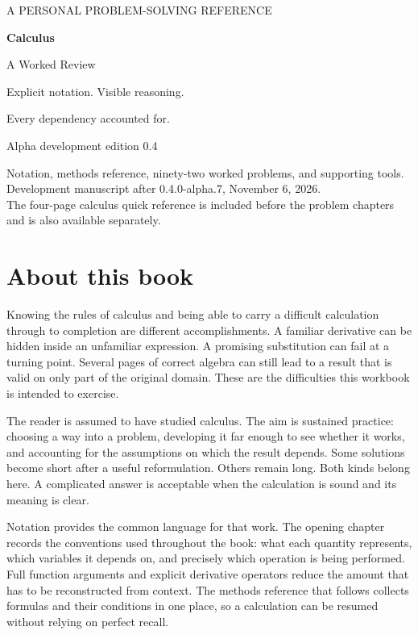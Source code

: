 \documentclass[11pt,oneside,openany]{book}
\begin{document}
\frontmatter
\begin{titlepage}
\color{Ink}
\vspace*{0.7in}
{\sffamily\large A PERSONAL PROBLEM-SOLVING REFERENCE\par}
\vspace{0.5in}
{\sffamily\bfseries\fontsize{40}{46}\selectfont Calculus\par}
\vspace{0.15in}
{\sffamily\LARGE A Worked Review\par}
\vspace{0.45in}
{\Large Explicit notation. Visible reasoning.\par}
{\Large Every dependency accounted for.\par}
\vfill
{\sffamily\large Alpha development edition 0.4\par}
\medskip
Notation, methods reference, ninety-two worked problems, and supporting tools.\\
Development manuscript after 0.4.0-alpha.7, November 6, 2026.\\
The four-page calculus quick reference is included before the problem chapters
and is also available separately.
\end{titlepage}
\chapter*{About this book}

Knowing the rules of calculus and being able to carry a difficult calculation
through to completion are different accomplishments. A familiar derivative can
be hidden inside an unfamiliar expression. A promising substitution can fail at
a turning point. Several pages of correct algebra can still lead to a result
that is valid on only part of the original domain. These are the difficulties
this workbook is intended to exercise.

The reader is assumed to have studied calculus. The aim is sustained practice:
choosing a way into a problem, developing it far enough to see whether it works,
and accounting for the assumptions on which the result depends. Some solutions
become short after a useful reformulation. Others remain long. Both kinds belong
here. A complicated answer is acceptable when the calculation is sound and its
meaning is clear.

Notation provides the common language for that work. The opening chapter records
the conventions used throughout the book: what each quantity represents, which
variables it depends on, and precisely which operation is being performed. Full
function arguments and explicit derivative operators reduce the amount that has
to be reconstructed from context. The methods reference that follows collects
formulas and their conditions in one place, so a calculation can be resumed
without relying on perfect recall.
\end{document}
